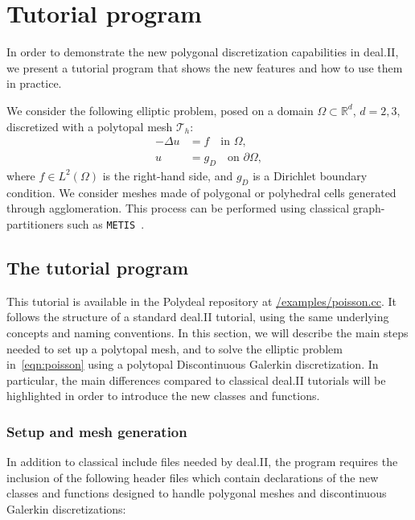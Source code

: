\documentclass[a4paper,12pt]{article}
\begin{document}
\section{{Tutorial program }}
\label{sec:polydeal}
In order to demonstrate the new polygonal discretization capabilities in deal.II, we present
a tutorial program that shows the new features and how to use them in practice.



We consider the following elliptic problem, posed on a domain $\Omega \subset \mathbb{R}^d$, $d=2,3$, discretized with
a polytopal mesh $\mathcal{T}_h$:
\begin{equation}\label{eqn:poisson}
    \begin{aligned}
        -\Delta u & = f \quad \text{in } \Omega,            \\
        u         & = g_D \quad \text{on } \partial \Omega,
    \end{aligned}
\end{equation}
where $f \in L^2(\Omega)$ is the right-hand side, and $g_D$ is a Dirichlet
boundary condition. We consider meshes made of polygonal or polyhedral cells generated through agglomeration. This process
can be performed using classical graph-partitioners such as \texttt{METIS}~\citep{METIS}.


\subsection{The tutorial program}

This tutorial is available in the Polydeal repository at \href{https://github.com/fdrmrc/Polydeal/blob/main/examples/poisson.cc}{/examples/poisson.cc}. It follows the structure of a standard deal.II tutorial, using the same underlying concepts and naming conventions. In this section, we will describe the main steps needed to set up a polytopal mesh, and to solve
the elliptic problem in~\eqref{eqn:poisson} using a polytopal Discontinuous Galerkin discretization. In particular, the main differences compared to
classical deal.II tutorials will be highlighted in order to introduce the new classes and functions.


\subsubsection{Setup and mesh generation}
In addition to classical include files needed by deal.II, the program requires the inclusion of the following header files
which contain declarations of the new classes and functions designed to handle polygonal meshes and discontinuous Galerkin
discretizations:
\end{document}
